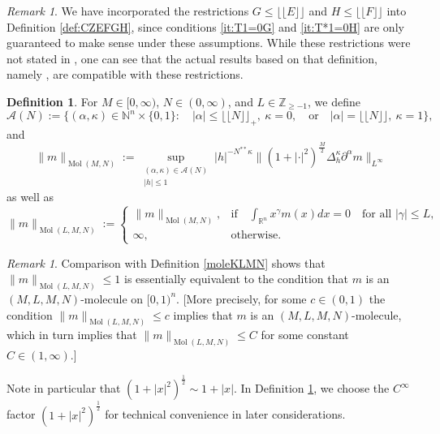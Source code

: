 \documentclass[11pt, reqno]{amsart}
\theoremstyle{definition}
\newtheorem{definition}[theorem]{Definition}
\theoremstyle{remark}
\newtheorem{remark}[theorem]{Remark}
\numberwithin{equation}{section}
\newcommand{\N}{\mathbb N}
\newcommand{\R}{\mathbb R}
\newcommand{\Z}{\mathbb Z}
\newcommand{\Floor}[1]{\lfloor\!\lfloor #1 \rfloor\!\rfloor}
\newcommand{\abs}[1]{|#1|}
\newcommand{\Norm}[2]{\|#1\|_{#2}}
\newcommand{\BNorm}[2]{\Big\|#1\Big\|_{#2}}
\begin{document}
\begin{remark}\label{rem:CZEFGH}
We have incorporated the restrictions $G\leq\Floor{E}$ and $H\leq\Floor{F}$ into Definition \ref{def:CZEFGH}, since conditions \eqref{it:T1=0G} and \eqref{it:T*1=0H} are only guaranteed to make sense under these assumptions. While these restrictions were not stated in \cite[Definition 6.17]{BHYY:1c}, one can see that the actual results based on that definition, namely \cite[Theorem 6.18, Proposition 6.19, and Corollaries 6.20--6.21]{BHYY:1c}, are compatible with these restrictions.
\end{remark}

\begin{definition}\label{def:moleNorm}
For $M\in[0,\infty)$, $N\in(0,\infty)$, and $L\in\Z_{\geq-1}$, we define
\begin{equation}\label{A(N)}
  \mathscr A(N):=\{(\alpha,\kappa)\in\N^n\times\{0,1\}:\quad\abs{\alpha}\leq\Floor{N}_+,\ \kappa=0,\quad\text{or}\quad\abs{\alpha}=\Floor{N},\ \kappa=1\},
\end{equation}
and
\begin{equation*}
  \Norm{m}{\operatorname{Mol}(M,N)}
  :=  \sup_{ \substack{ (\alpha,\kappa)\in\mathscr A(N) \\ \abs{h}\leq 1 }}
   \abs{h}^{-N^{**}\kappa}  \BNorm{(1+\abs{\cdot}^2)^{\frac{M}{2}}
      \Delta_h^{\kappa}\partial^\alpha m }{L^\infty}
\end{equation*}
as well as
\begin{equation*}
  \Norm{m}{\operatorname{Mol}(L,M,N)}
  :=\begin{cases} \Norm{m}{\operatorname{Mol}(M,N)}, &
  \text{if}\quad\int_{\R^n} x^\gamma m(x)dx=0\quad\text{for all }\abs{\gamma}\leq L, \\
  \infty, & \text{otherwise}.\end{cases}
\end{equation*}
\end{definition}

\begin{remark}\label{rem:moleNorm}
Comparison with Definition \ref{moleKLMN} shows that $\Norm{m}{\operatorname{Mol}(L,M,N)}\leq 1$ is essentially equivalent to the condition that $m$ is an $(M,L,M,N)$-molecule on $[0,1)^n$.
[More precisely, for some $c\in(0,1)$ the condition $\Norm{m}{\operatorname{Mol}(L,M,N)}\leq c$ implies that $m$ is an $(M,L,M,N)$-molecule, which in turn implies that $\Norm{m}{\operatorname{Mol}(L,M,N)}\leq C$ for some constant $C\in(1,\infty)$.]

Note in particular that $(1+\abs{x}^2)^{\frac12}\sim 1+\abs{x}$. In Definition \ref{def:moleNorm}, we choose the $C^\infty$ factor $(1+\abs{x}^2)^{\frac12}$ for technical convenience in later considerations.
\end{remark}
\end{document}
